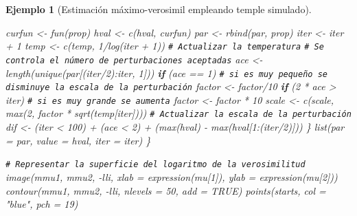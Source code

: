 \documentclass[
  10pt,
]{book}
\newenvironment{Shaded}{\begin{snugshade}}{\end{snugshade}}
\newcommand{\AttributeTok}[1]{\textcolor[rgb]{0.77,0.63,0.00}{#1}}
\newcommand{\CommentTok}[1]{\textcolor[rgb]{0.56,0.35,0.01}{\textit{#1}}}
\newcommand{\ConstantTok}[1]{\textcolor[rgb]{0.00,0.00,0.00}{#1}}
\newcommand{\ControlFlowTok}[1]{\textcolor[rgb]{0.13,0.29,0.53}{\textbf{#1}}}
\newcommand{\DecValTok}[1]{\textcolor[rgb]{0.00,0.00,0.81}{#1}}
\newcommand{\FunctionTok}[1]{\textcolor[rgb]{0.00,0.00,0.00}{#1}}
\newcommand{\NormalTok}[1]{#1}
\newcommand{\OtherTok}[1]{\textcolor[rgb]{0.56,0.35,0.01}{#1}}
\newcommand{\SpecialCharTok}[1]{\textcolor[rgb]{0.00,0.00,0.00}{#1}}
\newcommand{\StringTok}[1]{\textcolor[rgb]{0.31,0.60,0.02}{#1}}
\theoremstyle{break}
\newtheorem{example}{Ejemplo}[chapter]
\theoremstyle{nonumberplain}
\renewcommand{\CommentTok}[1]{\textcolor[rgb]{0.41,0.41,0.41}{\texttt{#1}}}
\begin{document}
\begin{example}[Estimación máximo-verosimil empleando temple simulado]
\begin{Shaded}
\begin{Highlighting}[]
\NormalTok{    curfun }\OtherTok{\textless{}{-}} \FunctionTok{fun}\NormalTok{(prop)}
\NormalTok{    hval }\OtherTok{\textless{}{-}} \FunctionTok{c}\NormalTok{(hval, curfun)}
\NormalTok{    par }\OtherTok{\textless{}{-}} \FunctionTok{rbind}\NormalTok{(par, prop)}
\NormalTok{    iter }\OtherTok{\textless{}{-}}\NormalTok{ iter }\SpecialCharTok{+} \DecValTok{1}
\NormalTok{    temp }\OtherTok{\textless{}{-}} \FunctionTok{c}\NormalTok{(temp, }\DecValTok{1}\SpecialCharTok{/}\FunctionTok{log}\NormalTok{(iter }\SpecialCharTok{+} \DecValTok{1}\NormalTok{))  }\CommentTok{\# Actualizar la temperatura}
    \CommentTok{\# Se controla el número de perturbaciones aceptadas}
\NormalTok{    ace }\OtherTok{\textless{}{-}} \FunctionTok{length}\NormalTok{(}\FunctionTok{unique}\NormalTok{(par[(iter}\SpecialCharTok{/}\DecValTok{2}\NormalTok{)}\SpecialCharTok{:}\NormalTok{iter, }\DecValTok{1}\NormalTok{]))}
    \ControlFlowTok{if}\NormalTok{ (ace }\SpecialCharTok{==} \DecValTok{1}\NormalTok{) }
      \CommentTok{\# si es muy pequeño se disminuye la escala de la perturbación}
\NormalTok{      factor }\OtherTok{\textless{}{-}}\NormalTok{ factor}\SpecialCharTok{/}\DecValTok{10}
    \ControlFlowTok{if}\NormalTok{ (}\DecValTok{2} \SpecialCharTok{*}\NormalTok{ ace }\SpecialCharTok{\textgreater{}}\NormalTok{ iter) }
      \CommentTok{\# si es muy grande se aumenta}
\NormalTok{      factor }\OtherTok{\textless{}{-}}\NormalTok{ factor }\SpecialCharTok{*} \DecValTok{10}
\NormalTok{    scale }\OtherTok{\textless{}{-}} \FunctionTok{c}\NormalTok{(scale, }\FunctionTok{max}\NormalTok{(}\DecValTok{2}\NormalTok{, factor }\SpecialCharTok{*} \FunctionTok{sqrt}\NormalTok{(temp[iter])))  }\CommentTok{\# Actualizar la escala de la perturbación}
\NormalTok{    dif }\OtherTok{\textless{}{-}}\NormalTok{ (iter }\SpecialCharTok{\textless{}} \DecValTok{100}\NormalTok{) }\SpecialCharTok{+}\NormalTok{ (ace }\SpecialCharTok{\textless{}} \DecValTok{2}\NormalTok{) }\SpecialCharTok{+}\NormalTok{ (}\FunctionTok{max}\NormalTok{(hval) }\SpecialCharTok{{-}} \FunctionTok{max}\NormalTok{(hval[}\DecValTok{1}\SpecialCharTok{:}\NormalTok{(iter}\SpecialCharTok{/}\DecValTok{2}\NormalTok{)]))}
\NormalTok{  \}}
  \FunctionTok{list}\NormalTok{(}\AttributeTok{par =}\NormalTok{ par, }\AttributeTok{value =}\NormalTok{ hval, }\AttributeTok{iter =}\NormalTok{ iter)}
\NormalTok{\}}

\CommentTok{\# Representar la superficie del logaritmo de la verosimilitud}
\FunctionTok{image}\NormalTok{(mmu1, mmu2, }\SpecialCharTok{{-}}\NormalTok{lli, }\AttributeTok{xlab =} \FunctionTok{expression}\NormalTok{(mu[}\DecValTok{1}\NormalTok{]), }\AttributeTok{ylab =} \FunctionTok{expression}\NormalTok{(mu[}\DecValTok{2}\NormalTok{]))}
\FunctionTok{contour}\NormalTok{(mmu1, mmu2, }\SpecialCharTok{{-}}\NormalTok{lli, }\AttributeTok{nlevels =} \DecValTok{50}\NormalTok{, }\AttributeTok{add =} \ConstantTok{TRUE}\NormalTok{)}
\FunctionTok{points}\NormalTok{(starts, }\AttributeTok{col =} \StringTok{"blue"}\NormalTok{, }\AttributeTok{pch =} \DecValTok{19}\NormalTok{)}


\end{Highlighting}
\end{Shaded}
\end{example}
\end{document}
